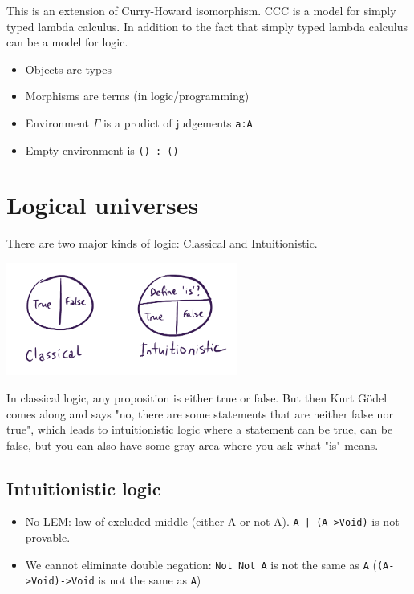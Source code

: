 \documentclass[11pt]{article}
\begin{document}
This is an extension of Curry-Howard isomorphism. CCC is a model for simply typed lambda calculus. In addition to the fact that simply typed lambda calculus can be a model for logic.

\begin{itemize}
\item Objects are types
\item Morphisms are terms (in logic/programming)
\item Environment \(\Gamma\) is a prodict of judgements \texttt{a:A}
\item Empty environment is \texttt{() : ()}
\end{itemize}

\section{Logical universes}
\label{sec:org1ee0905}

There are two major kinds of logic: Classical and Intuitionistic.

\begin{center}
\includegraphics[width=3.0in]{./img/logics.png}
\end{center}

In classical logic, any proposition is either true or false. But then Kurt Gödel comes along and says "no, there are some statements that are neither false nor true", which leads to intuitionistic logic where a statement can be true, can be false, but you can also have some gray area where you ask what "is" means.

\subsection{Intuitionistic logic}
\label{sec:org70dafa2}
\begin{itemize}
\item No LEM: law of excluded middle (either A or not A). \texttt{A | (A->Void)} is not provable.
\item We cannot eliminate double negation: \texttt{Not Not A} is not the same as \texttt{A} (\texttt{(A->Void)->Void} is not the same as \texttt{A})
\end{itemize}
\end{document}
